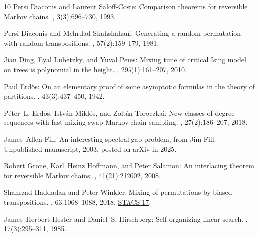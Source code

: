 \documentclass[11pt]{article}
\begin{document}
\begin{thebibliography}{10}
{\sc Persi Diaconis and Laurent Saloff-Coste}: Comparison theorems for
  reversible {M}arkov chains.
, 3(3):696--730, 1993.

{\sc Persi Diaconis and Mehrdad Shahshahani}: Generating a random permutation
  with random transpositions.
, 57(2):159--179, 1981.
\newblock [\epfmtdoi{10.1007/BF00535487}]

{\sc Jian Ding, Eyal Lubetzky, and Yuval Peres}: Mixing time of critical
  {I}sing model on trees is polynomial in the height.
, 295(1):161--207, 2010.
\newblock [\epfmtdoi{10.1007/s00220-009-0978-y}]

{\sc Paul Erd\H{o}s}: On an elementary proof of some asymptotic formulas in the
  theory of partitions.
, 43(3):437--450, 1942.
\newblock [\epfmtdoi{10.2307/1968802}]

{\sc P{\'e}ter~L. Erd\H{o}s, Istv{\'a}n Mikl{\'o}s, and Zolt{\'an} Toroczkai}:
  New classes of degree sequences with fast mixing swap {M}arkov chain
  sampling.
, 27(2):186--207, 2018.
\newblock [\epfmtdoi{10.1017/S0963548317000499}]

{\sc James~Allen Fill}: An interesting spectral gap problem, from {J}im {F}ill.
\newblock Unpublished manuscript, 2003, posted on arXiv in 2025.

{\sc Robert Grone, Karl~Heinz Hoffmann, and Peter Salamon}: An interlacing
  theorem for reversible {M}arkov chains.
, 41(21):212002, 2008.
\newblock [\epfmtdoi{10.1088/1751-8113/41/21/212002}]

{\sc Shahrzad Haddadan and Peter Winkler}: Mixing of permutations by biased
  transpositions.
, 63:1068--1088, 2018.
\newblock \prelim
  \href{https://doi.org/10.4230/LIPIcs.STACS.2017.41}{STACS'17}.
\newblock [\epfmtdoi{10.1007/s00224-018-9899-5}]

{\sc James~Herbert Hester and Daniel~S. Hirschberg}: Self-organizing linear
  search.
, 17(3):295--311, 1985.
\newblock [\epfmtdoi{10.1145/5505.5507}]


\end{thebibliography}
\end{document}
